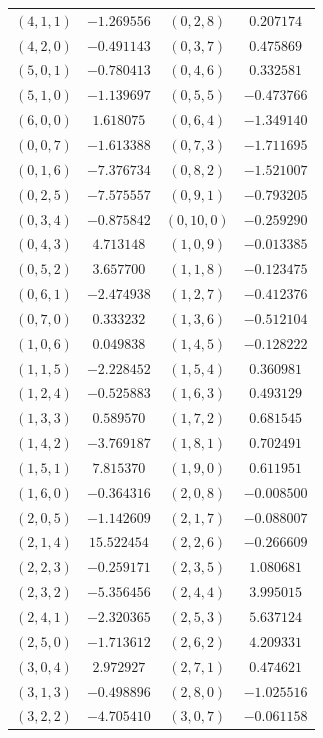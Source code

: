 \begin{table}
\begin{tabular}{cc@{\qquad}cc}
$(4,1,1)$ & $-1.269556$ & $(0,2,8)$ & $0.207174$ \\
$(4,2,0)$ & $-0.491143$ & $(0,3,7)$ & $0.475869$ \\
$(5,0,1)$ & $-0.780413$ & $(0,4,6)$ & $0.332581$ \\
$(5,1,0)$ & $-1.139697$ & $(0,5,5)$ & $-0.473766$ \\
$(6,0,0)$ & $1.618075$ & $(0,6,4)$ & $-1.349140$ \\
$(0,0,7)$ & $-1.613388$ & $(0,7,3)$ & $-1.711695$ \\
$(0,1,6)$ & $-7.376734$ & $(0,8,2)$ & $-1.521007$ \\
$(0,2,5)$ & $-7.575557$ & $(0,9,1)$ & $-0.793205$ \\
$(0,3,4)$ & $-0.875842$ & $(0,10,0)$ & $-0.259290$ \\
$(0,4,3)$ & $4.713148$ & $(1,0,9)$ & $-0.013385$ \\
$(0,5,2)$ & $3.657700$ & $(1,1,8)$ & $-0.123475$ \\
$(0,6,1)$ & $-2.474938$ & $(1,2,7)$ & $-0.412376$ \\
$(0,7,0)$ & $0.333232$ & $(1,3,6)$ & $-0.512104$ \\
$(1,0,6)$ & $0.049838$ & $(1,4,5)$ & $-0.128222$ \\
$(1,1,5)$ & $-2.228452$ & $(1,5,4)$ & $0.360981$ \\
$(1,2,4)$ & $-0.525883$ & $(1,6,3)$ & $0.493129$ \\
$(1,3,3)$ & $0.589570$ & $(1,7,2)$ & $0.681545$ \\
$(1,4,2)$ & $-3.769187$ & $(1,8,1)$ & $0.702491$ \\
$(1,5,1)$ & $7.815370$ & $(1,9,0)$ & $0.611951$ \\
$(1,6,0)$ & $-0.364316$ & $(2,0,8)$ & $-0.008500$ \\
$(2,0,5)$ & $-1.142609$ & $(2,1,7)$ & $-0.088007$ \\
$(2,1,4)$ & $15.522454$ & $(2,2,6)$ & $-0.266609$ \\
$(2,2,3)$ & $-0.259171$ & $(2,3,5)$ & $1.080681$ \\
$(2,3,2)$ & $-5.356456$ & $(2,4,4)$ & $3.995015$ \\
$(2,4,1)$ & $-2.320365$ & $(2,5,3)$ & $5.637124$ \\
$(2,5,0)$ & $-1.713612$ & $(2,6,2)$ & $4.209331$ \\
$(3,0,4)$ & $2.972927$ & $(2,7,1)$ & $0.474621$ \\
$(3,1,3)$ & $-0.498896$ & $(2,8,0)$ & $-1.025516$ \\
$(3,2,2)$ & $-4.705410$ & $(3,0,7)$ & $-0.061158$ \\

\end{tabular}
\end{table}
